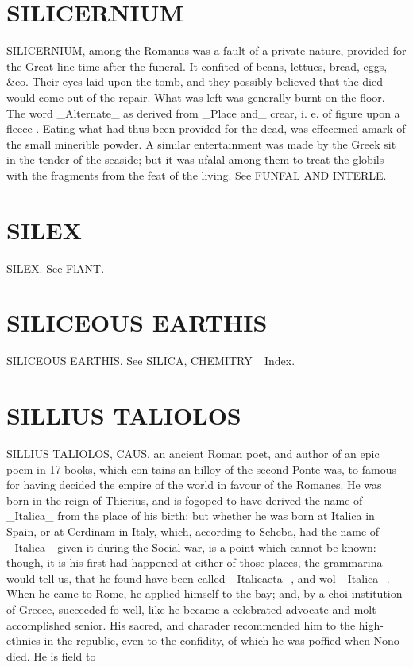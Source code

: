 \documentclass{article}
\begin{document}
\section*{SILICERNIUM}
SILICERNIUM, among the Romanus was a fault of a private nature, provided for the Great line time after the funeral. It confited of beans, lettues, bread, eggs, \&co. Their eyes laid upon the tomb, and they possibly believed that the died would come out of the repair. What was left was generally burnt on the floor. The word \_Alternate\_ as derived from \_Place and\_ crear, i. e. of figure upon a fleece . Eating what had thus been provided for the dead, was effecemed amark of the small minerible powder. A similar entertainment was made by the Greek sit in the tender of the seaside; but it was ufalal among them to treat the globils with the fragments from the feat of the living. See FUNFAL AND INTERLE.

\section*{SILEX}
SILEX. See FlANT.

\section*{SILICEOUS EARTHIS}
SILICEOUS EARTHIS. See SILICA, CHEMITRY \_Index.\_

\section*{SILLIUS TALIOLOS}
SILLIUS TALIOLOS, CAUS, an ancient Roman poet, and author of an epic poem in 17 books, which con-tains an hilloy of the second Ponte was, to famous for having decided the empire of the world in favour of the Romanes. He was born in the reign of Thierius, and is fogoped to have derived the name of \_Italica\_ from the place of his birth; but whether he was born at Italica in Spain, or at Cerdinam in Italy, which, according to Scheba, had the name of \_Italica\_ given it during the Social war, is a point which cannot be known: though, it is his first had happened at either of those places, the grammarina would tell us, that he found have been called \_Italicaeta\_, and wol \_Italica\_. When he came to Rome, he applied himself to the bay; and, by a choi institution of Greece, succeeded fo well, like he became a celebrated advocate and molt accomplished senior. His sacred, and charader recommended him to the high- ethnics in the republic, even to the confidity, of which he was poffied when Nono died. He is field to
\end{document}

